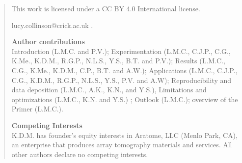\documentclass{article}
\begin{document}
\begin{quote}\small
\noindent This work is licensed under a CC BY 4.0 International license.

\noindent lucy.collinson@crick.ac.uk .

\noindent\textbf{Author contributions}\\
Introduction (L.M.C. and P.V.); Experimentation (L.M.C., C.J.P., C.G., K.Me., K.D.M., R.G.P., N.L.S., Y.S., B.T. and P.V.); Results (L.M.C., C.G., K.Me., K.D.M., C.P., B.T. and A.W.); Applications (L.M.C., C.J.P., C.G., K.D.M., R.G.P., N.L.S., Y.S., P.V. and A.W); Reproducibility and data deposition (L.M.C., A.K., K.N., and Y.S.), Limitations and optimizations (L.M.C., K.N. and Y.S.) ; Outlook (L.M.C.); overview of the Primer (L.M.C.).

\noindent\textbf{Competing Interests}\\
K.D.M. has founder’s equity interests in Aratome, LLC (Menlo Park, CA), an enterprise that produces array tomography materials and services. All other authors declare no competing interests.


\end{quote}
\end{document}
